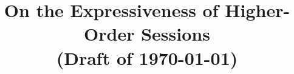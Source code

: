 \documentclass[envcountsect,orivec]{llncs}
\begin{document}
\pagestyle{plain}

\title {
	On the Expressiveness of Higher-Order Sessions \\ (Draft of \today)
}
\maketitle






%



%

%

%

%





%
%
%
\end{document}
